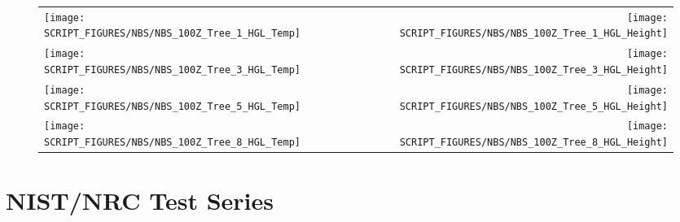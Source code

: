\begin{figure}[p]
\begin{tabular*}{\textwidth}{l@{\extracolsep{\fill}}r}
\texttt{[image: SCRIPT\_FIGURES/NBS/NBS\_100Z\_Tree\_1\_HGL\_Temp]} &
\texttt{[image: SCRIPT\_FIGURES/NBS/NBS\_100Z\_Tree\_1\_HGL\_Height]} \\
\texttt{[image: SCRIPT\_FIGURES/NBS/NBS\_100Z\_Tree\_3\_HGL\_Temp]} &
\texttt{[image: SCRIPT\_FIGURES/NBS/NBS\_100Z\_Tree\_3\_HGL\_Height]} \\
\texttt{[image: SCRIPT\_FIGURES/NBS/NBS\_100Z\_Tree\_5\_HGL\_Temp]} &
\texttt{[image: SCRIPT\_FIGURES/NBS/NBS\_100Z\_Tree\_5\_HGL\_Height]} \\
\texttt{[image: SCRIPT\_FIGURES/NBS/NBS\_100Z\_Tree\_8\_HGL\_Temp]} &
\texttt{[image: SCRIPT\_FIGURES/NBS/NBS\_100Z\_Tree\_8\_HGL\_Height]}
\end{tabular*}
\end{figure}

\clearpage

\section{NIST/NRC Test Series}

